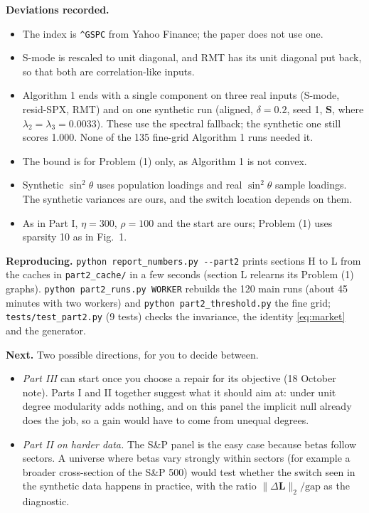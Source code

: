\documentclass[11pt,a4paper]{article}
\newcommand{\Lap}{\mathbf{L}}
\newcommand{\Smat}{\mathbf{S}}
\theoremstyle{remark}
\begin{document}
\textbf{Deviations recorded.}
\begin{itemize}
\item The index is \texttt{\^{}GSPC} from Yahoo Finance; the paper does not use one.
\item S-mode is rescaled to unit diagonal, and RMT has its unit diagonal put back, so
  that both are correlation-like inputs.
\item Algorithm 1 ends with a single component on three real inputs (S-mode,
  resid-SPX, RMT) and on one synthetic run (aligned, $\delta=0.2$, seed 1, $\Smat$,
  where $\lambda_2=\lambda_3=0.0033$). These use the spectral fallback; the synthetic one
  still scores 1.000. None of the 135 fine-grid Algorithm 1 runs needed it.
\item The bound is for Problem (1) only, as Algorithm 1 is not convex.
\item Synthetic $\sin^2\theta$ uses population loadings and real $\sin^2\theta$ sample
  loadings. The synthetic variances are ours, and the switch location depends on them.
\item As in Part I, $\eta=300$, $\rho=100$ and the start are ours; Problem (1) uses
  sparsity 10 as in Fig.~1.
\end{itemize}

\textbf{Reproducing.} \texttt{python report\_numbers.py -{}-part2} prints sections H to L
from the caches in \texttt{part2\_cache/} in a few seconds (section L relearns its
Problem (1) graphs). \texttt{python part2\_runs.py WORKER} rebuilds the 120 main runs
(about 45 minutes with two workers) and \texttt{python part2\_threshold.py} the fine
grid; \texttt{tests/test\_part2.py} (9 tests) checks the invariance, the identity
\eqref{eq:market} and the generator.

\textbf{Next.} Two possible directions, for you to decide between.
\begin{itemize}
\item \emph{Part III} can start once you choose a repair for its objective (18 October
  note). Parts I and II together suggest what it should aim at: under unit degree
  modularity adds nothing, and on this panel the implicit null already does the job,
  so a gain would have to come from unequal degrees.
\item \emph{Part II on harder data.} The S\&P panel is the easy case because betas
  follow sectors. A universe where betas vary strongly within sectors (for example a
  broader cross-section of the S\&P 500) would test whether the switch seen in the
  synthetic data happens in practice, with the ratio
  $\lVert\Delta\Lap\rVert_2/\mathrm{gap}$ as the diagnostic.
\end{itemize}
\end{document}
